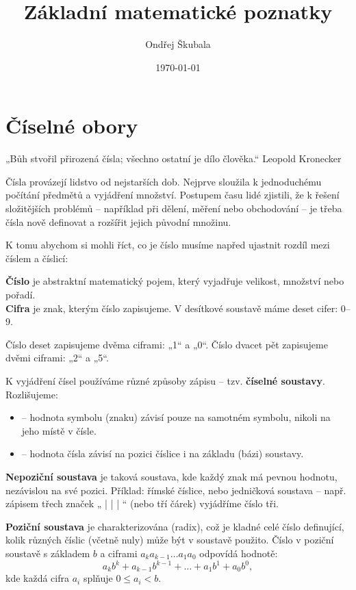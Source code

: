\documentclass[12pt,a4paper]{article}
\title{Základní matematické poznatky}
\author{Ondřej Škubala}
\date{\today}
\begin{document}
\maketitle
\newpage


\section{Číselné obory}

\begin{quotebox}
{„Bůh stvořil přirozená čísla; všechno ostatní je dílo člověka.“}
{Leopold Kronecker}
\end{quotebox}

Čísla provázejí lidstvo od nejstarších dob. Nejprve sloužila k jednoduchému
počítání předmětů a vyjádření množství. Postupem času lidé zjistili, že
k řešení složitějších problémů – například při dělení, měření nebo obchodování – 
je třeba čísla nově definovat a rozšířit jejich původní množinu. 

K tomu abychom si mohli říct, co je číslo musíme napřed ujastnit rozdíl mezi číslem a číslicí:

\begin{definitionbox}
\textbf{Číslo} je abstraktní matematický pojem, který vyjadřuje velikost, množství
nebo pořadí.\\
\textbf{Cifra} je znak, kterým číslo zapisujeme. V desítkové soustavě máme deset
cifer: 0–9.
\end{definitionbox}

\begin{examplebox}
Číslo deset zapisujeme dvěma ciframi: „1“ a „0“. Číslo dvacet pět zapisujeme dvěmi ciframi: „2“ a „5“.
\end{examplebox}


K vyjádření čísel používáme různé způsoby zápisu – tzv. \textbf{číselné soustavy}.  
Rozlišujeme:

\begin{itemize}
    \item {} – hodnota symbolu (znaku) závisí pouze na samotném symbolu, nikoli na jeho místě v čísle.
    \item {} – hodnota čísla závisí na pozici číslice i na základu (bázi) soustavy.
\end{itemize}

\begin{definitionbox}
\textbf{Nepoziční soustava} je taková soustava, kde každý znak má pevnou hodnotu, nezávislou na své pozici.  
Příklad: římské číslice, nebo jedničková soustava – např. zápisem třech značek „ | | | “ (nebo tří čárek) vyjádříme číslo tři.  
\end{definitionbox}
\newpage
\begin{definitionbox}
\textbf{Poziční soustava} je charakterizována  (radix), což je kladné celé číslo definující, kolik různých číslic (včetně nuly) může být v soustavě použito.  
Číslo v poziční soustavě s základem \(b\) a ciframi \(a_k a_{k-1} \dots a_1 a_0\) odpovídá hodnotě:
\[
a_k b^k + a_{k-1} b^{k-1} + \dots + a_1 b^1 + a_0 b^0,
\]
kde každá cifra \(a_i\) splňuje \(0 \le a_i < b\).  
\end{definitionbox}
\end{document}
